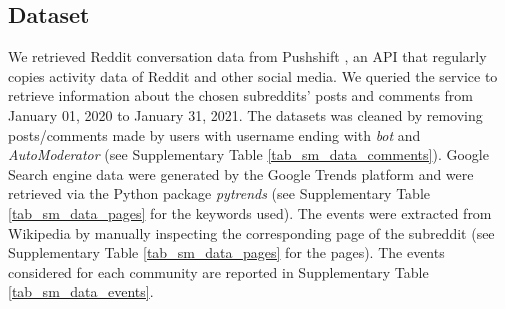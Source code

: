 \documentclass[fleqn,10pt]{wlscirep}
\begin{document}
\subsection*{Dataset}
%
We retrieved Reddit conversation data from Pushshift \cite{baumgartner2020pushshift}, an API that regularly copies activity data of Reddit and other social media. We queried the service to retrieve information about the chosen subreddits' posts and comments from January 01, 2020 to January 31, 2021. The datasets was cleaned by removing posts/comments made by users with username ending with \emph{bot} and \emph{AutoModerator} (see Supplementary Table \ref{tab_sm_data_comments}).
%
Google Search engine data were generated by the Google Trends platform and were retrieved via the Python package \emph{pytrends} (see Supplementary Table \ref{tab_sm_data_pages} for the keywords used).
%
The events were extracted from Wikipedia by manually inspecting the corresponding page of the subreddit (see Supplementary Table \ref{tab_sm_data_pages} for the pages). The events considered for each community are reported in Supplementary Table \ref{tab_sm_data_events}.
%
\end{document}
